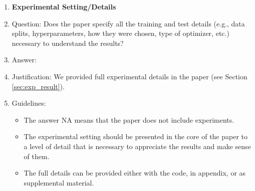 \documentclass{article}
\begin{document}
\begin{enumerate}
\item {\bf Experimental Setting/Details}
    \item[] Question: Does the paper specify all the training and test details (e.g., data splits, hyperparameters, how they were chosen, type of optimizer, etc.) necessary to understand the results?
    \item[] Answer: \answerYes{} %
    \item[] Justification: We provided full experimental details in the paper (see Section \ref{sec:exp_result}).
    \item[] Guidelines:
    \begin{itemize}
        \item The answer NA means that the paper does not include experiments.
        \item The experimental setting should be presented in the core of the paper to a level of detail that is necessary to appreciate the results and make sense of them.
        \item The full details can be provided either with the code, in appendix, or as supplemental material.
    \end{itemize}


\end{enumerate}
\end{document}
